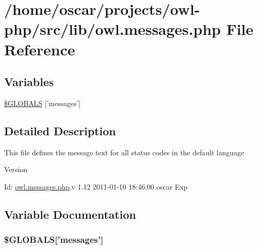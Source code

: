 \section{/home/oscar/projects/owl-\/php/src/lib/owl.messages.php File Reference}
\label{owl_8messages_8php}
\subsection*{Variables}
\begin{DoxyCompactItemize}
\item 
\hyperlink{owl_8messages_8php_a65f2996116eed36e9ab25f254a470259}{\$GLOBALS} \mbox{[}'messages'\mbox{]}
\end{DoxyCompactItemize}


\subsection{Detailed Description}
This file defines the message text for all status codes in the default language \begin{DoxyVersion}{Version}

\end{DoxyVersion}
\begin{DoxyParagraph}{Id:}
\hyperlink{owl_8messages_8php}{owl.messages.php},v 1.12 2011-\/01-\/10 18:46:00 oscar Exp 
\end{DoxyParagraph}


\subsection{Variable Documentation}
\subsubsection[{\$GLOBALS}]{\setlength{\rightskip}{0pt plus 5cm}\$GLOBALS\mbox{[}'messages'\mbox{]}}\label{owl_8messages_8php_a65f2996116eed36e9ab25f254a470259}
